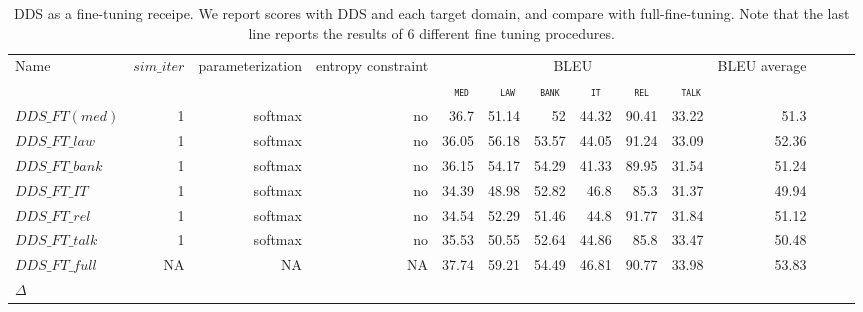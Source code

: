 \documentclass[11pt,a4paper]{article}
\newcommand{\domain}[1]{\texttt{\textsc{#1}}}
\newcommand{\system}[1]{\texttt{{#1}}}
\begin{document}


\begin{table}[htb]
  \centering%
  \begin{adjustbox}{width=1.0\textwidth,center}
  \begin{tabular}{|p{3.0cm}|*{13}{r|}} \hline
    \multirow{2}{*}{Name} & \multirow{2}{*}{$sim\_iter$} & \multirow{2}{*}{parameterization} & \multirow{2}{*}{entropy constraint} & \multicolumn{6}{|c|}{BLEU} & \multirow{2}{*}{BLEU average} \\ \cline{5-10}	
   & & & & \multicolumn{1}{c|}{\domain{ med}} & \multicolumn{1}{c|}{\domain{ law}} & \multicolumn{1}{c|}{\domain{bank}} & \multicolumn{1}{c|}{\domain{it}} & \multicolumn{1}{c|}{\domain{ rel }} & \multicolumn{1}{c|}{\domain{ talk}} &  \\
    \hline
  \system{$DDS\_FT (med)$} & 1 & softmax & no & 36.7&51.14&52&44.32&90.41&33.22&51.3\\
  \system{$DDS\_FT\_law$} & 1 & softmax & no &36.05&56.18&53.57&44.05&91.24&33.09&52.36\\
  \system{$DDS\_FT\_bank$} & 1 & softmax & no &36.15&54.17&54.29&41.33&89.95&31.54&51.24 \\
  \system{$DDS\_FT\_IT$} & 1 & softmax & no &34.39&48.98&52.82&46.8&85.3&31.37&49.94 \\
  \system{$DDS\_FT\_rel$} & 1 & softmax & no & 34.54&52.29&51.46&44.8&91.77&31.84&51.12\\
  \system{$DDS\_FT\_talk$} & 1 & softmax & no & 35.53&50.55&52.64&44.86&85.8&33.47&50.48\\
  \system{$DDS\_FT\_full$} & NA & NA & NA & 37.74&59.21	&54.49&46.81&90.77&33.98&53.83\\
    \hline
    $\Delta$ & \\
  \end{tabular}
  \end{adjustbox}
  \caption{DDS as a fine-tuning receipe. We report scores with DDS and each target domain, and compare with full-fine-tuning. Note that the last line reports the results of 6 different fine tuning procedures.}
  \label{tab:finetuning}
\end{table}
\end{document}
